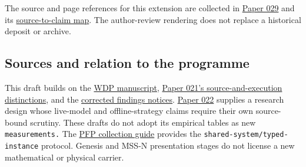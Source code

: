 \documentclass[
  11pt,
]{article}
\begin{document}
The source and page references for this extension are collected in
\href{../029/paper.pdf}{Paper 029} and its
\href{../029/docs/source_to_claim_map.md}{source-to-claim map}. The
author-review rendering does not replace a historical deposit or
archive.

\subsection{Sources and relation to the
programme}\label{sources-and-relation-to-the-programme}

This draft builds on the
\href{https://github.com/dbccpage/the_symbol_game/blob/59dde95a7860063c25d75db37f40af556e9f28ee/atlas/coda_atlas/F004_papers/001_finite_obstruction_calculus/000_witnessed_difference_programme/witnessed_difference_programme.md}{WDP
manuscript},
\href{https://github.com/dbccpage/the_symbol_game/blob/59dde95a7860063c25d75db37f40af556e9f28ee/atlas/coda_atlas/F004_papers/015_pfp/021_recreated_demos_and_proposal_fidelity_evidence/paper.md}{Paper
021's source-and-execution distinctions}, and the
\href{https://github.com/dbccpage/the_symbol_game/blob/59dde95a7860063c25d75db37f40af556e9f28ee/atlas/coda_atlas/F004_papers/015_pfp/symbol_game_challenge_and_demos_findings/README.md}{corrected
findings notices}.
\href{https://github.com/dbccpage/the_symbol_game/blob/59dde95a7860063c25d75db37f40af556e9f28ee/atlas/coda_atlas/F004_papers/015_pfp/022_pfp_frontier_research/paper.md}{Paper
022} supplies a research design whose live-model and offline-strategy
claims require their own source-bound scrutiny. These drafts do not
adopt its empirical tables as new \nolinkurl{measurements.} The
\href{https://github.com/dbccpage/the_symbol_game/blob/59dde95a7860063c25d75db37f40af556e9f28ee/atlas/coda_atlas/F004_papers/015_pfp/README.md}{PFP
collection guide} provides the \nolinkurl{shared-system/typed-instance}
protocol. Genesis and MSS-N presentation stages do not license a new
mathematical or physical carrier.
\end{document}
